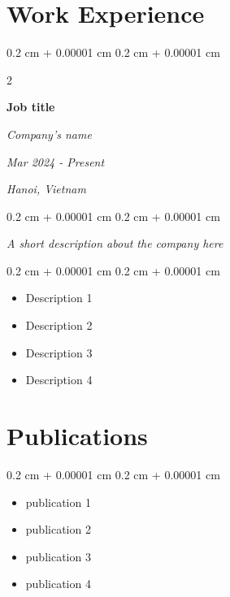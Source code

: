 \documentclass[10pt, letterpaper]{article}
\newenvironment{highlights}{
    \begin{itemize}[
        topsep=0.10 cm,
        parsep=0.10 cm,
        partopsep=0pt,
        itemsep=0pt,
        leftmargin=0.4 cm + 10pt
    ]
}{
    \end{itemize}
} %
\newenvironment{onecolentry}{
    \begin{adjustwidth}{
        0.2 cm + 0.00001 cm
    }{
        0.2 cm + 0.00001 cm
    }
}{
    \end{adjustwidth}
} %
\newenvironment{twocolentry}[2][]{
    \onecolentry
    \def\secondColumn{#2}
    \setcolumnwidth{\fill, 4.5 cm}
    \begin{paracol}{2}
}{
    \switchcolumn \raggedleft \secondColumn
    \end{paracol}
    \endonecolentry
} %
\begin{document}
\section{Work Experience}

        \begin{twocolentry}{
        \textit{ Mar 2024 - Present} %
        
        \textit{Hanoi, Vietnam} %
        }     
        
            \textbf{Job title} %
            
            \textit{{Company's name}} %
        \end{twocolentry}
        \begin{onecolentry}
            \hspace{-8pt}
           \textit{A short description about the company here}
        \end{onecolentry}

        \vspace{0.10 cm}
        \begin{onecolentry}
            \begin{highlights}
                \item Description 1 %
                \item Description 2 %
                \item Description 3
                \item Description 4
            \end{highlights}
        \end{onecolentry}
        \vspace{0.2 cm}

\section{Publications}

        \vspace{0.10 cm}
        \begin{onecolentry}
            \begin{highlights}
                \item publication 1 %
                \item publication 2
                \item publication 3
                \item publication 4
                       
            \end{highlights}
        \end{onecolentry}
        \vspace{0.2 cm}  
\end{document}
